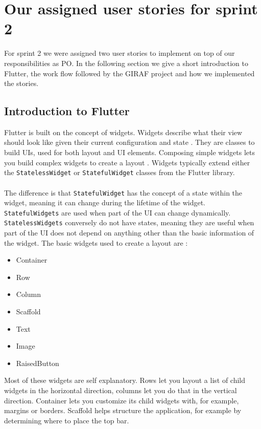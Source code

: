 \section{Our assigned user stories for sprint 2}
For sprint 2 we were assigned two user stories to implement on top of our responsibilities as PO.
In the following section we give a short introduction to Flutter, the work flow followed by the GIRAF project and how we implemented the stories.

\subsection{Introduction to Flutter}
Flutter is built on the concept of widgets.
Widgets describe what their view should look like given their current configuration and state \cite{Flutterwidget}. 
They are classes to build UIs, used for both layout and UI elements.
Composing simple widgets lets you build complex widgets to create a layout \cite{Flutterlayout}.
Widgets typically extend either the \texttt{StatelessWidget} or \texttt{StatefulWidget} classes from the Flutter library.
\\\\
The difference is that \texttt{StatefulWidget} has the concept of a state within the widget, meaning it can change during the lifetime of the widget.
\texttt{StatefulWidgets} are used when part of the UI can change dynamically.
\texttt{StatelessWidgets} conversely do not have states, meaning they are useful when part of the UI does not depend on anything other than the basic information of the widget. 
The basic widgets used to create a layout are \cite{FlutterBasicWidgets}:
 \begin{itemize}
    \item Container
    \item Row
    \item Column  
    \item Scaffold
    \item Text
    \item Image
    \item RaisedButton 
 \end{itemize} 
Most of these widgets are self explanatory. 
Rows let you layout a list of child widgets in the horizontal direction, columns let you do that in the vertical direction.
Container lets you customize its child widgets with, for example, margins or borders.
Scaffold helps structure the application, for example by determining where to place the top bar.

